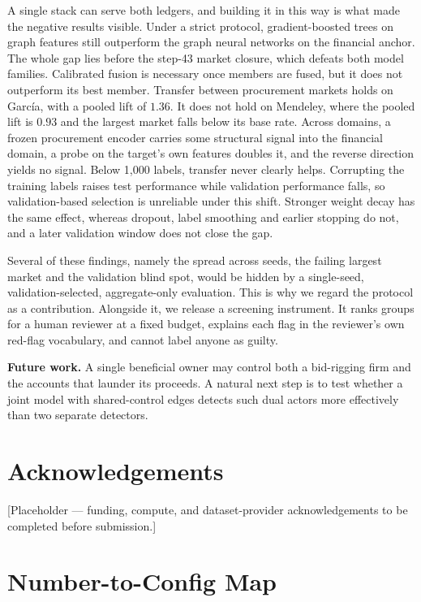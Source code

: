 \documentclass[conference]{IEEEtran}
\begin{document}
A single stack can serve both ledgers, and building it in this way is what made
the negative results visible. Under a strict protocol, gradient-boosted trees on graph features still
outperform the graph neural networks on the financial anchor. The whole gap
lies before the step-43 market closure, which defeats both model families. Calibrated fusion is necessary once members are fused,
but it does not outperform its best member. Transfer between procurement
markets holds on Garc\'ia, with a pooled lift of $1.36$. It does not hold on Mendeley,
where the pooled lift is $0.93$ and the largest market falls below its base
rate. Across domains, a frozen procurement encoder carries some structural
signal into the financial domain, a probe on the target's own features doubles
it, and the reverse direction yields no signal. Below 1,000 labels, transfer
never clearly helps. Corrupting the training labels raises test performance
while validation performance falls, so validation-based selection is unreliable
under this shift. Stronger weight decay has the same effect, whereas dropout,
label smoothing and earlier stopping do not, and a later validation window does
not close the gap.

Several of these findings, namely the spread across seeds, the failing largest
market and the validation blind spot, would be hidden by a single-seed,
validation-selected, aggregate-only evaluation. This is why we regard the
protocol as a contribution. Alongside it, we release a screening instrument. It ranks groups for a human
reviewer at a fixed budget, explains each flag in the reviewer's own red-flag
vocabulary, and cannot label anyone as guilty.

\textbf{Future work.} A single beneficial owner may control both a bid-rigging
firm and the accounts that launder its proceeds. A natural next step is to test
whether a joint model with shared-control edges detects such dual actors more
effectively than two separate detectors.

\section*{Acknowledgements}

[Placeholder --- funding, compute, and dataset-provider acknowledgements to be
completed before submission.]

\appendices

\section{Number-to-Config Map}
\label{app:repro}
\end{document}
